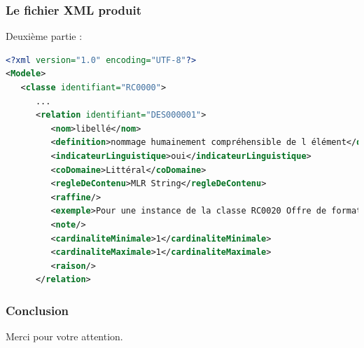 \documentclass{beamer}
\begin{document}
\begin{frame}[fragile]
\frametitle{Le fichier XML produit}

Deuxième partie :

\vspace{0.5cm}
\begin{lstlisting}[language=XML]
<?xml version="1.0" encoding="UTF-8"?>
<Modele>
   <classe identifiant="RC0000">
      ...
      <relation identifiant="DES000001">
         <nom>libellé</nom>
         <definition>nommage humainement compréhensible de l élément</definition>
         <indicateurLinguistique>oui</indicateurLinguistique>
         <coDomaine>Littéral</coDomaine>
         <regleDeContenu>MLR String</regleDeContenu>
         <raffine/>
         <exemple>Pour une instance de la classe RC0020 Offre de formation, le libellé pourraît être " BTS services informatiques aux organisations"</exemple>
         <note/>
         <cardinaliteMinimale>1</cardinaliteMinimale>
         <cardinaliteMaximale>1</cardinaliteMaximale>
         <raison/>
      </relation>
\end{lstlisting}
\end{frame}

\begin{frame}
\frametitle{Conclusion}

Merci pour votre attention.


\end{frame}
\end{document}
